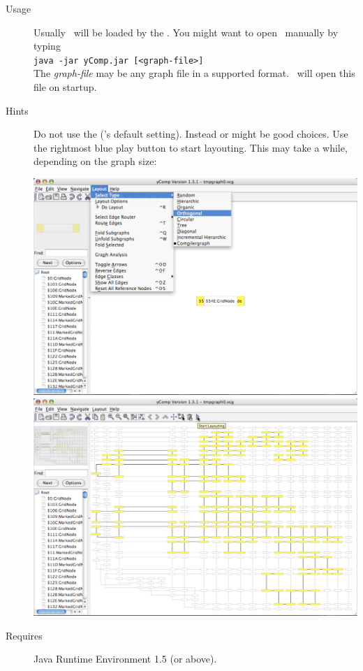 \begin{description}
  \item[Usage] Usually \yComp\ will be loaded by the \GrShell. You might want to open \yComp\ manually by typing\\
   \texttt{java -jar yComp.jar [<graph-file>]}\\
  The \emph{graph-file} may be any graph file in a supported format. \yComp\ will open this file on startup.
  \item[Hints] Do not use the   (\yComp's default setting). Instead \texttt{} or \texttt{} might be good choices. Use the rightmost blue play button to start layouting. This may take a while, depending on the graph size:
\begin{center}
\includegraphics[width=0.45\linewidth]{fig/ycomp1.pdf} \includegraphics[width=0.45\linewidth]{fig/ycomp2.pdf}
\end{center}
  \item[Requires] Java Runtime Environment 1.5 (or above).
\end{description}

